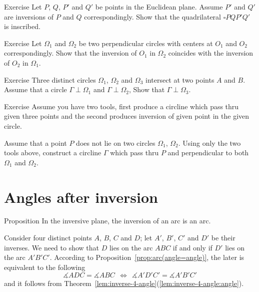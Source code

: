 \begin{thm}{Exercise}\label{ex:inscribed+inv}
Let $P$, $Q$, $P'$ and $Q'$ be points in the Euclidean plane.
Assume $P'$ and $Q'$ are inversions 
of $P$ and $Q$ correspondingly.
Show that the quadrilateral $\square PQP'Q'$ is inscribed.
\end{thm}

\begin{thm}{Exercise}\label{ex:centers-of-perp-circles}
Let $\Omega_1$ and $\Omega_2$ be two perpendicular circles with centers at $O_1$ and $O_2$ correspondingly.
Show that the inversion of $O_1$ in $\Omega_2$ 
coincides with 
the inversion of $O_2$ in $\Omega_1$.
\end{thm}

\begin{thm}{Exercise}\label{ex:4-th-perp-circ}
Three distinct circles $\Omega_1$, $\Omega_2$ and $\Omega_3$ intersect at two points $A$ and $B$.
Assume that a circle $\Gamma\perp\Omega_1$ and $\Gamma\perp\Omega_2$,
Show that $\Gamma\perp\Omega_3$.
\end{thm}

\begin{thm}{Exercise}\label{ex:construction-perp-clines}
Assume you have two tools,
first produce a circline which pass thru given three points 
and the second produces inversion of given point in the given circle.

Assume that a point $P$ does not lie on two circles $\Omega_1$, $\Omega_2$.
Using only the two tools above,
construct a circline $\Gamma$ which pass thru $P$ 
and perpendicular to both $\Omega_1$ and $\Omega_2$.
\end{thm}

\section*{Angles after inversion}

\begin{thm}{Proposition}
In the inversive plane,
the inversion of an arc is an arc.
\end{thm}

Consider four distinct points $A$, $B$, $C$ and $D$; 
let $A'$, $B'$, $C'$ and $D'$  be their inverses.
We need to show that $D$ lies on the arc $ABC$ if and only if $D'$ lies on the arc $A'B'C'$.
According to Proposition~\ref{prop:arc(angle=angle)},
the later is equivalent to the following
$$\measuredangle ADC= \measuredangle ABC
\ \  \iff\ \ 
\measuredangle A'D'C'= \measuredangle A'B'C'$$
and it follows from Theorem~\ref{lem:inverse-4-angle}(\ref{lem:inverse-4-angle:angle}).
\qeds

